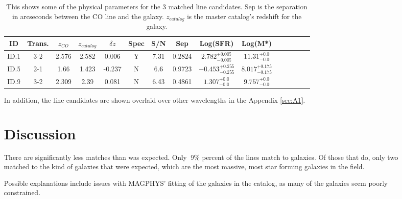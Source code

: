 \begin{table}
\caption{This shows some of the physical parameters for the 3 matched line candidates. Sep is the separation in arcseconds between the CO line and the galaxy. $z_{catalog}$ is the master catalog's redshift for the galaxy.}
\begin{tabular}{ccccccccccccccc}
ID & Trans. & $z_{CO}$ & $z_{catalog}$ & $\delta z$ & Spec & S/N & Sep & Log(SFR) & Log(M*) \\
\hline
ID.1 & 3-2 & 2.576 & 2.582 & 0.006 & Y & 7.31 & 0.2824 & $2.782_{-0.005}^{+0.005}$ & $11.31_{-0.0}^{+0.0}$  \\
ID.5 & 2-1 & 1.66 & 1.423 & -0.237 & N & 6.6 & 0.9723 & $-0.453_{-0.255}^{+0.255}$ & $8.017_{-0.175}^{+0.175}$ \\
ID.9 & 3-2 & 2.309 & 2.39 & 0.081 & N & 6.43 & 0.4861 & $1.307_{-0.0}^{+0.0}$ & $9.757_{-0.0}^{+0.0}$ \\
\end{tabular}\label{table:matched_gal}
\end{table}

In addition, the line candidates are shown overlaid over other wavelengths in the Appendix \ref{sec:A1}.

\section{Discussion}

There are significantly less matches than was expected. Only $~$9\% percent of the lines match to galaxies. Of those that do, only two matched to the kind of galaxies that were expected, which are the most massive, most star forming galaxies in the field. 

Possible explanations include issues with MAGPHYS' fitting of the galaxies in the catalog, as many of the galaxies seem poorly constrained. 